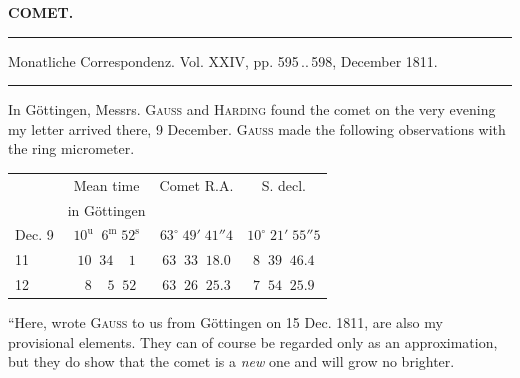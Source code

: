 \clearpage{}\hypertarget{native-348-lower}{}\label{native-348-lower}
\begin{center}\textbf{COMET.}\par\vspace{4pt}\hrule\vspace{4pt}\fontsize{10}{12}\selectfont Monatliche Correspondenz. Vol. XXIV, pp. 595\,..\,598, December 1811.\par\vspace{4pt}\hrule\vspace{4pt}\end{center}

\par\indent In Göttingen, Messrs. \textsc{Gauss} and \textsc{Harding} found the comet on the very evening my letter arrived there, 9 December. \textsc{Gauss} made the following observations with the ring micrometer.

\begin{center}
\fontsize{10}{12}\selectfont\setlength{\tabcolsep}{4pt}\renewcommand{\arraystretch}{1.15}\begin{tabular}{l|c|c|c}
 & Mean time & Comet R.A. & S. decl. \\
 & in Göttingen & & \\ \hline
Dec. 9 & $10^{\mathrm u}\;\;6^{\mathrm m}\;52^{\mathrm s}$ & $63^\circ\;49'\;41''4$ & $10^\circ\;21'\;55''5$ \\
11 & $10\;\;34\;\;\;\;1$ & $63\;\;33\;\;18.0$ & $8\;\;39\;\;46.4$ \\
12 & $\;\;8\;\;\;\;5\;\;52$ & $63\;\;26\;\;25.3$ & $7\;\;54\;\;25.9$ \\
\end{tabular}
\end{center}

\par\indent “Here, wrote \textsc{Gauss} to us from Göttingen on 15 Dec. 1811, are also my provisional elements. They can of course be regarded only as an approximation, but they do show that the comet is a \emph{new} one and will grow no brighter.

